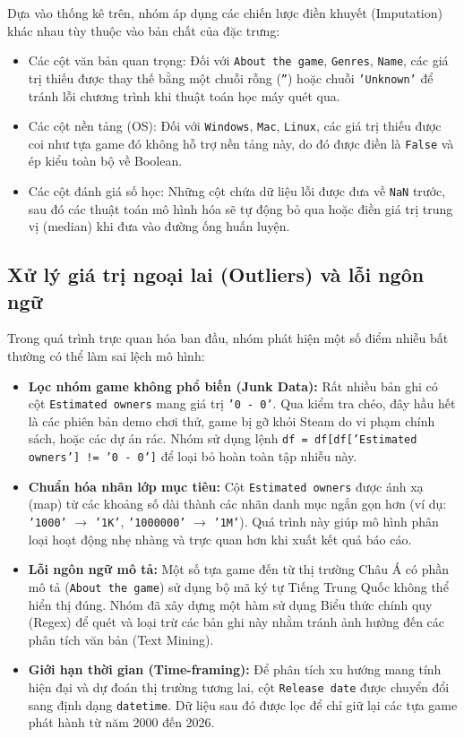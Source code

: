 \hspace{1cm} Dựa vào thống kê trên, nhóm áp dụng các chiến lược điền khuyết (Imputation) khác nhau tùy thuộc vào bản chất của đặc trưng:
\begin{itemize}
    \item Các cột văn bản quan trọng: Đối với \texttt{About the game}, \texttt{Genres}, \texttt{Name}, các giá trị thiếu được thay thế bằng một chuỗi rỗng (\texttt{''}) hoặc chuỗi \texttt{'Unknown'} để tránh lỗi chương trình khi thuật toán học máy quét qua.
    \item Các cột nền tảng (OS): Đối với \texttt{Windows}, \texttt{Mac}, \texttt{Linux}, các giá trị thiếu được coi như tựa game đó không hỗ trợ nền tảng này, do đó được điền là \texttt{False} và ép kiểu toàn bộ về Boolean.
    \item Các cột đánh giá số học: Những cột chứa dữ liệu lỗi được đưa về \texttt{NaN} trước, sau đó các thuật toán mô hình hóa sẽ tự động bỏ qua hoặc điền giá trị trung vị (median) khi đưa vào đường ống huấn luyện.
\end{itemize}

\subsection{Xử lý giá trị ngoại lai (Outliers) và lỗi ngôn ngữ}
\hspace{1cm} Trong quá trình trực quan hóa ban đầu, nhóm phát hiện một số điểm nhiễu bất thường có thể làm sai lệch mô hình:
\begin{itemize}
    \item \textbf{Lọc nhóm game không phổ biến (Junk Data):} Rất nhiều bản ghi có cột \texttt{Estimated owners} mang giá trị \texttt{'0 - 0'}. Qua kiểm tra chéo, đây hầu hết là các phiên bản demo chơi thử, game bị gỡ khỏi Steam do vi phạm chính sách, hoặc các dự án rác. Nhóm sử dụng lệnh \texttt{df = df[df['Estimated owners'] != '0 - 0']} để loại bỏ hoàn toàn tập nhiễu này.
    \item \textbf{Chuẩn hóa nhãn lớp mục tiêu:} Cột \texttt{Estimated owners} được ánh xạ (map) từ các khoảng số dài thành các nhãn danh mục ngắn gọn hơn (ví dụ: \texttt{'1000'} $\rightarrow$ \texttt{'1K'}, \texttt{'1000000'} $\rightarrow$ \texttt{'1M'}). Quá trình này giúp mô hình phân loại hoạt động nhẹ nhàng và trực quan hơn khi xuất kết quả báo cáo.
    \item \textbf{Lỗi ngôn ngữ mô tả:} Một số tựa game đến từ thị trường Châu Á có phần mô tả (\texttt{About the game}) sử dụng bộ mã ký tự Tiếng Trung Quốc không thể hiển thị đúng. Nhóm đã xây dựng một hàm sử dụng Biểu thức chính quy (Regex) để quét và loại trừ các bản ghi này nhằm tránh ảnh hưởng đến các phân tích văn bản (Text Mining).
    \item \textbf{Giới hạn thời gian (Time-framing):} Để phân tích xu hướng mang tính hiện đại và dự đoán thị trường tương lai, cột \texttt{Release date} được chuyển đổi sang định dạng \texttt{datetime}. Dữ liệu sau đó được lọc để chỉ giữ lại các tựa game phát hành từ năm 2000 đến 2026.
\end{itemize}


